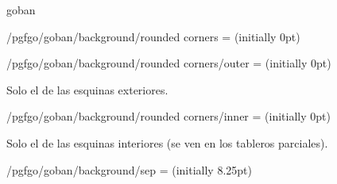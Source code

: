 \begin{environment}{{goban}}
\begin{key}{/pgfgo/goban/background/rounded corners = (initially 0pt)}
\begin{codeexample}[]
			\begin{goban}[name = a]
			\end{goban}
			
			\begin{goban}[background = {rounded corners = 10pt}, resume = a]
			\end{goban}
		\end{codeexample}
	\end{key}
	
	
	\begin{key}{/pgfgo/goban/background/rounded corners/outer = (initially 0pt)}
		
		Solo el de las esquinas exteriores.
		
		\begin{codeexample}[]
			
			\begin{goban}[background = {rounded corners = 0pt}, name = a]
			\end{goban}
			
			\begin{goban}[background = {rounded corners = {outer = 10pt}}, resume = a]
			\end{goban}
		\end{codeexample}
	\end{key}
	
	
	\begin{key}{/pgfgo/goban/background/rounded corners/inner = (initially 0pt)}
		
		Solo el de las esquinas interiores (se ven en los tableros parciales).
		
		\begin{codeexample}[]
			
			\begin{goban}[background = {rounded corners = 0pt}, name = a]
			\end{goban}
			
			\begin{goban}[resume = a,
				background = {rounded corners = {outer = 8pt, inner = 2pt}}]
			\end{goban}
		\end{codeexample}
	\end{key}
	
	\begin{key}{/pgfgo/goban/background/sep = (initially 8.25pt)}
		

\end{key}
\end{environment}
